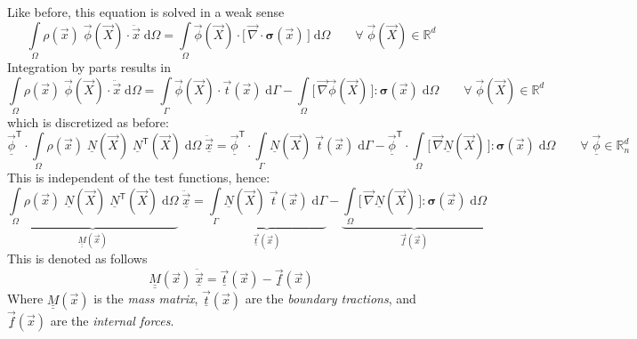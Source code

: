 \documentclass[times,namecite]{goose-article}
\begin{document}
Like before, this equation is solved in a weak sense
\begin{equation}
  \int\limits_\Omega
    \rho(\vec{x})\; \vec{\phi}(\vec{X}) \cdot \ddot{\vec{x}} \;
  \mathrm{d}\Omega
  =
  \int\limits_\Omega
    \vec{\phi}(\vec{X})
    \cdot
    \Big[\,
      \vec{\nabla}
      \cdot
      \bm{\sigma}(\vec{x})
    \,\Big] \;
  \mathrm{d}\Omega
  \qquad
  \forall \; \vec{\phi}(\vec{X}) \in \mathbb{R}^d
\end{equation}
Integration by parts results in
\begin{equation}
  \int\limits_\Omega
    \rho(\vec{x})\; \vec{\phi}(\vec{X}) \cdot \ddot{\vec{x}} \;
  \mathrm{d}\Omega
  =
  \int\limits_\Gamma
    \vec{\phi}(\vec{X}) \cdot \vec{t}(\vec{x}) \;
  \mathrm{d}\Gamma
  -
  \int\limits_\Omega
    \big[\, \vec{\nabla} \vec{\phi}(\vec{X}) \,\big]
    :
    \bm{\sigma}(\vec{x}) \;
  \mathrm{d}\Omega
  \qquad
  \forall \; \vec{\phi}(\vec{X}) \in \mathbb{R}^d
\end{equation}
which is discretized as before:
\begin{equation}
  \underline{\vec{\phi}}^\mathsf{T} \cdot
  \int\limits_\Omega
    \rho(\vec{x})\; \underline{N}(\vec{X})\; \underline{N}^\mathsf{T}(\vec{X}) \;
  \mathrm{d}\Omega \;
  \underline{\ddot{\vec{x}}}
  =
  \underline{\vec{\phi}}^\mathsf{T} \cdot
  \int\limits_\Gamma
    \underline{N}(\vec{X})\; \vec{t}(\vec{x}) \;
  \mathrm{d}\Gamma
  -
  \underline{\vec{\phi}}^\mathsf{T} \cdot
  \int\limits_\Omega
    \big[\, \vec{\nabla} \underline{N}(\vec{X}) \,\big]
    :
    \bm{\sigma}(\vec{x}) \;
  \mathrm{d}\Omega
  \qquad
  \forall \; \underline{\vec{\phi}} \in \mathbb{R}^d_n
\end{equation}
This is independent of the test functions, hence:
\begin{equation}
  \underbrace{
    \int\limits_\Omega
      \rho(\vec{x})\; \underline{N}(\vec{X})\; \underline{N}^\mathsf{T}(\vec{X}) \;
    \mathrm{d}\Omega
  }_{\underline{\underline{M}}(\vec{x})} \;
  \underline{\ddot{\vec{x}}}
  =
  \underbrace{
    \int\limits_\Gamma
      \underline{N}(\vec{X})\; \vec{t}(\vec{x}) \;
    \mathrm{d}\Gamma
  }_{\underline{\vec{t}}(\vec{x})}
  -
  \underbrace{
    \int\limits_\Omega
      \big[\, \vec{\nabla} \underline{N}(\vec{X}) \,\big]
      :
      \bm{\sigma}(\vec{x}) \;
    \mathrm{d}\Omega
  }_{\underline{\vec{f}}(\vec{x})}
\end{equation}
This is denoted as follows
\begin{equation}
  \underline{\underline{M}}(\vec{x})\; \underline{\ddot{\vec{x}}}
  =
  \underline{\vec{t}}(\vec{x})
  -
  \underline{\vec{f}}(\vec{x})
\end{equation}
Where $\underline{\underline{M}}(\vec{x})$ is the \emph{mass matrix}, $\underline{\vec{t}}(\vec{x})$ are the \emph{boundary tractions}, and $\underline{\vec{f}}(\vec{x})$ are the \emph{internal forces}.
\end{document}
